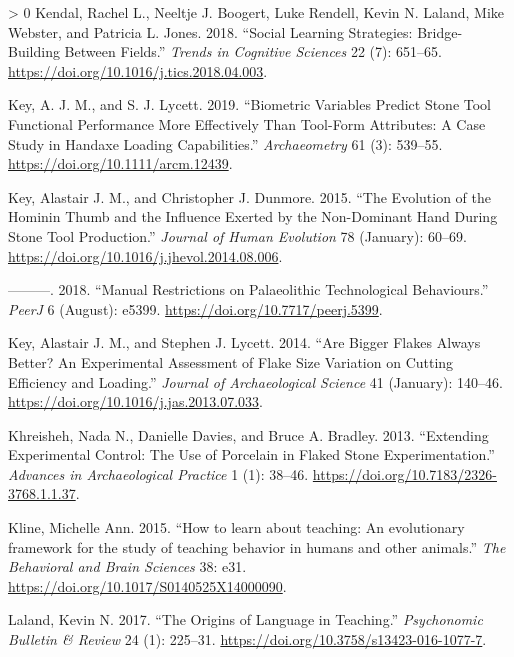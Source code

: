 \documentclass[smallextended]{svjour3}       %
\newlength{\cslhangindent}
\newenvironment{CSLReferences}[3] %
 {%
  \setlength{\parindent}{0pt}
  \ifodd #1 \everypar{\setlength{\hangindent}{\cslhangindent}}\ignorespaces\fi
  \ifnum #2 > 0
  \setlength{\parskip}{#3\baselineskip}
  \fi
 }%
 {}
\begin{document}
\begin{CSLReferences}{1}{0}
\leavevmode\hypertarget{ref-kendal2018}{}%
Kendal, Rachel L., Neeltje J. Boogert, Luke Rendell, Kevin N. Laland,
Mike Webster, and Patricia L. Jones. 2018. {``Social Learning
Strategies: Bridge-Building Between Fields.''} \emph{Trends in Cognitive
Sciences} 22 (7): 651--65.
\url{https://doi.org/10.1016/j.tics.2018.04.003}.

\leavevmode\hypertarget{ref-key2019}{}%
Key, A. J. M., and S. J. Lycett. 2019. {``Biometric Variables Predict
Stone Tool Functional Performance More Effectively Than Tool-Form
Attributes: A Case Study in Handaxe Loading Capabilities.''}
\emph{Archaeometry} 61 (3): 539--55.
\url{https://doi.org/10.1111/arcm.12439}.

\leavevmode\hypertarget{ref-key2015}{}%
Key, Alastair J. M., and Christopher J. Dunmore. 2015. {``The Evolution
of the Hominin Thumb and the Influence Exerted by the Non-Dominant Hand
During Stone Tool Production.''} \emph{Journal of Human Evolution} 78
(January): 60--69. \url{https://doi.org/10.1016/j.jhevol.2014.08.006}.

\leavevmode\hypertarget{ref-key2018}{}%
---------. 2018. {``Manual Restrictions on Palaeolithic Technological
Behaviours.''} \emph{PeerJ} 6 (August): e5399.
\url{https://doi.org/10.7717/peerj.5399}.

\leavevmode\hypertarget{ref-key2014}{}%
Key, Alastair J. M., and Stephen J. Lycett. 2014. {``Are Bigger Flakes
Always Better? An Experimental Assessment of Flake Size Variation on
Cutting Efficiency and Loading.''} \emph{Journal of Archaeological
Science} 41 (January): 140--46.
\url{https://doi.org/10.1016/j.jas.2013.07.033}.

\leavevmode\hypertarget{ref-khreisheh2013}{}%
Khreisheh, Nada N., Danielle Davies, and Bruce A. Bradley. 2013.
{``Extending Experimental Control: The Use of Porcelain in Flaked Stone
Experimentation.''} \emph{Advances in Archaeological Practice} 1 (1):
38--46. \url{https://doi.org/10.7183/2326-3768.1.1.37}.

\leavevmode\hypertarget{ref-kline2015}{}%
Kline, Michelle Ann. 2015. {``How to learn about teaching: An
evolutionary framework for the study of teaching behavior in humans and
other animals.''} \emph{The Behavioral and Brain Sciences} 38: e31.
\url{https://doi.org/10.1017/S0140525X14000090}.

\leavevmode\hypertarget{ref-laland2017}{}%
Laland, Kevin N. 2017. {``The Origins of Language in Teaching.''}
\emph{Psychonomic Bulletin \& Review} 24 (1): 225--31.
\url{https://doi.org/10.3758/s13423-016-1077-7}.


\end{CSLReferences}
\end{document}
